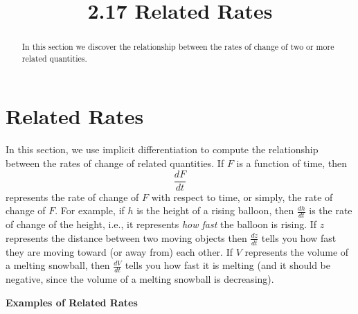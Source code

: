 \documentclass[handout]{ximera}
\title{2.17 Related Rates}
\begin{document}
\begin{abstract}
In this section we discover the relationship between the rates of change of two or more related quantities.
\end{abstract}

\maketitle


\section{Related Rates}

In this section, we use implicit differentiation to compute the relationship between 
the rates of change of related quantities.
If $F$ is a function of time, then 
\[ \frac{dF}{dt} \]
represents the rate of change of $F$ with respect to time, or simply, the rate of change of $F$.
For example, if $h$ is the height of a rising balloon, then $\frac{dh}{dt}$
is the rate of change of the height, i.e., it represents \textit{how fast}
the balloon is rising. If $z$ represents the distance between two moving 
objects then $\frac{dz}{dt}$ tells you how fast they are moving toward 
(or away from) each other.  If $V$ represents the volume of a melting snowball, 
then $\frac{dV}{dt}$ tells you how fast it is melting (and it should be negative, 
since the volume of a melting snowball is decreasing).


\begin{center}
\bf{Examples of Related Rates}
\end{center}
\end{document}
